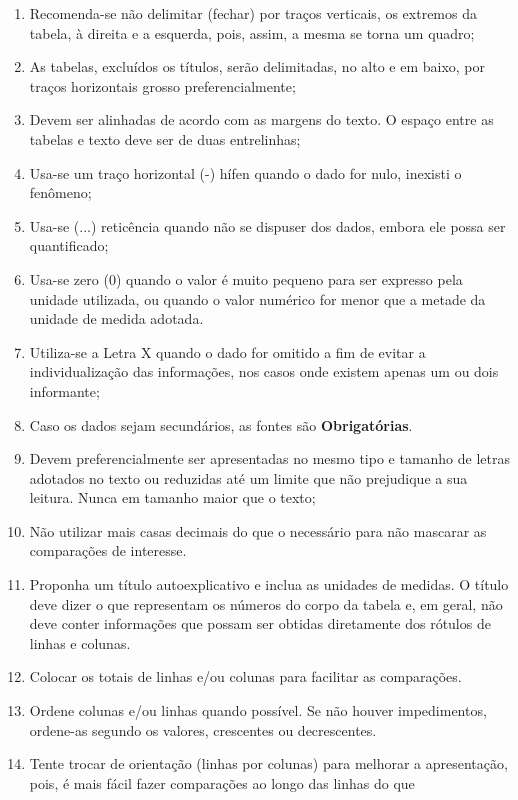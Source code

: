 \begin{enumerate}
continuará na folha seguinte e, nesse caso, não é delimitada por
um traço horizontal na parte inferior, sendo o titulo e o
cabeçalho repetido na folha seguinte; 
\item Recomenda-se não
delimitar (fechar) por traços verticais, os extremos da tabela, à
direita e a esquerda, pois, assim, a mesma se torna um quadro;
\item As tabelas, excluídos os títulos, serão delimitadas, no alto e em baixo, por traços horizontais grosso preferencialmente;
\item Devem ser alinhadas de acordo com as margens do texto. O espaço entre as tabelas e texto deve ser de duas entrelinhas;
\item Usa-se um traço horizontal (-) hífen quando o dado for nulo, inexisti o fenômeno; 
\item Usa-se (...) reticência quando não se dispuser dos dados,
embora ele possa ser quantificado; 
\item Usa-se zero (0) quando o valor é muito pequeno para ser expresso pela unidade utilizada, ou quando o valor numérico for menor que a metade da unidade de medida adotada.
\item Utiliza-se a Letra X quando o dado for omitido
a fim de evitar a individualização das
informações, nos casos onde existem
apenas um ou dois informante;
\item Caso os dados sejam secundários, as fontes são \textbf{Obrigatórias}.
\item Devem preferencialmente ser apresentadas no mesmo tipo e tamanho de letras adotados no texto ou reduzidas até um limite que não prejudique a sua leitura. Nunca em tamanho maior que o texto;
\item Não utilizar mais casas decimais do que o necessário para
não mascarar as comparações de interesse. 
\newpage
\item Proponha um título
autoexplicativo e inclua as unidades de medidas. O título deve
dizer o que representam os números do corpo da tabela e, em geral,
não deve conter informações que possam ser obtidas diretamente dos
rótulos de linhas e colunas. 
\item Colocar os totais de linhas
e/ou colunas para facilitar as comparações. 
\item Ordene colunas
e/ou linhas quando possível. Se não houver impedimentos, ordene-as
segundo os valores, crescentes ou decrescentes. 
\item Tente trocar
de orientação (linhas por colunas) para melhorar a apresentação,
pois, é mais fácil fazer comparações ao longo das linhas do que

\end{enumerate}
